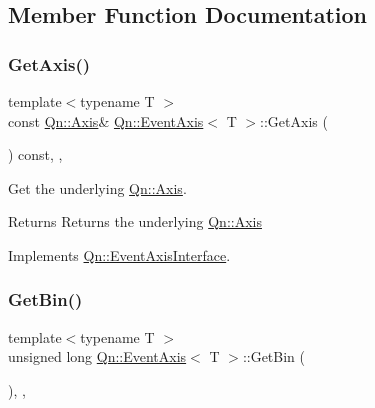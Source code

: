 \subsection{Member Function Documentation}
\mbox{\label{classQn_1_1EventAxis_a7fba5bcfeb2877ced0aa0006ce82d26c}} 
\subsubsection{\texorpdfstring{Get\+Axis()}{GetAxis()}}
{\footnotesize\ttfamily template$<$typename T $>$ \\
const \mbox{\hyperlink{classQn_1_1Axis}{Qn\+::\+Axis}}\& \mbox{\hyperlink{classQn_1_1EventAxis}{Qn\+::\+Event\+Axis}}$<$ T $>$\+::Get\+Axis (\begin{DoxyParamCaption}{ }\end{DoxyParamCaption}) const\hspace{0.3cm}{\ttfamily [inline]}, {\ttfamily [override]}, {\ttfamily [virtual]}}



Get the underlying \mbox{\hyperlink{classQn_1_1Axis}{Qn\+::\+Axis}}. 

\begin{DoxyReturn}{Returns}
Returns the underlying \mbox{\hyperlink{classQn_1_1Axis}{Qn\+::\+Axis}} 
\end{DoxyReturn}


Implements \mbox{\hyperlink{classQn_1_1EventAxisInterface}{Qn\+::\+Event\+Axis\+Interface}}.

\mbox{\label{classQn_1_1EventAxis_af5799b86d0e326c4d7b2e31e4a6ba086}} 
\subsubsection{\texorpdfstring{Get\+Bin()}{GetBin()}}
{\footnotesize\ttfamily template$<$typename T $>$ \\
unsigned long \mbox{\hyperlink{classQn_1_1EventAxis}{Qn\+::\+Event\+Axis}}$<$ T $>$\+::Get\+Bin (\begin{DoxyParamCaption}{ }\end{DoxyParamCaption})\hspace{0.3cm}{\ttfamily [inline]}, {\ttfamily [override]}, {\ttfamily [virtual]}}



